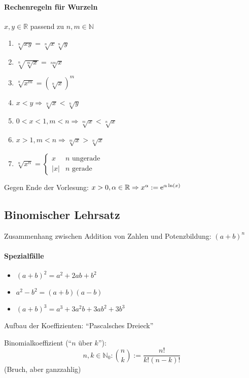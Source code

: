 \paragraph{Rechenregeln für Wurzeln} $x,y \in \mathbb{R}$ passend zu $n,m \in\mathbb{N}$
\begin{enumerate}
 \item $\sqrt[n]{xy} = \sqrt[n]x \sqrt[n]y$
 \item $\sqrt[n]{\sqrt[m]x} = \sqrt[nm]x$
 \item $\sqrt[n]{x^m} = (\sqrt[n]x)^m$
 \item $x<y \Rightarrow \sqrt[n]x < \sqrt[n]y$
 \item $0<x<1, m<n \Rightarrow \sqrt[m]{x} < \sqrt[n]{x}$
 \item $x>1, m<n \Rightarrow \sqrt[m]x > \sqrt[n]x$
 \item $\sqrt[n]{x^n} = \begin{cases} x & n \text{ ungerade} \\ |x| & n \text{ gerade} \end{cases}$
\end{enumerate}


\induction

Gegen Ende der Vorlesung: $x > 0, \alpha \in \mathbb{R} \Rightarrow x^\alpha := \operatorname{e}^{\alpha \operatorname{ln}(x)}$

\subsection{Binomischer Lehrsatz}

Zusammenhang zwischen Addition von Zahlen und Potenzbildung: $(a+b)^n$
\paragraph{Spezialfälle}
\begin{itemize}
 \item $(a+b)^2 = a^2+2ab+b^2$
 \item $a^2-b^2 = (a+b)(a-b)$
 \item $(a+b)^3=a^3+3a^2b+3ab^2+3b^3$
\end{itemize}

Aufbau der Koeffizienten: ``Pascalsches Dreieck''

\begin{definition} Binomialkoeffizient (``$n$ über $k$''):
 \begin{equation*} n,k \in \mathbb{N}_0: {n \choose k} := \frac{n!}{k!(n-k)!}\end{equation*}
 (Bruch, aber ganzzahlig)
\end{definition}

